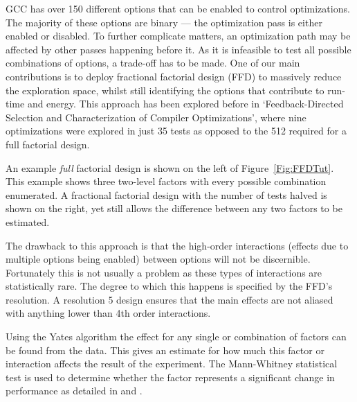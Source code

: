\documentclass[twocolumn]{article}
\begin{document}
GCC has over 150 different options that can be enabled to control optimizations. The majority of these options are binary --- the optimization pass is either enabled or disabled. To further complicate matters, an optimization path may be affected by other passes happening before it. As it is infeasible to test all possible combinations of options, a trade-off has to be made. One of our main contributions is to deploy fractional factorial design (FFD) to massively reduce the exploration space, whilst still identifying the options that contribute to run-time and energy. This approach has been explored before in `Feedback-Directed Selection and Characterization of Compiler Optimizations'\cite{IntelPaper}, where nine optimizations were explored in just 35 tests as opposed to the 512 required for a full factorial design.

An example \textit{full} factorial design is shown on the left of Figure~\ref{Fig:FFDTut}. This example shows three two-level factors with every possible combination enumerated. A fractional factorial design with the number of tests halved is shown on the right, yet still allows the difference between any two factors to be estimated.

The drawback to this approach is that the high-order interactions (effects due to multiple options being enabled) between options will not be discernible. Fortunately this is not usually a problem as these types of interactions are statistically rare. The degree to which this happens is specified by the FFD's resolution. A resolution 5 design ensures that the main effects are not aliased with anything lower than 4th order interactions.

Using the Yates algorithm\cite{BoxHunter} the effect for any single or combination of factors can be found from the data. This gives an estimate for how much this factor or interaction affects the result of the experiment. The Mann-Whitney statistical test is used to determine whether the factor represents a significant change in performance as detailed in \cite{EnergyReductionCompilerOptions} and \cite{Haneda2005}.
\end{document}
